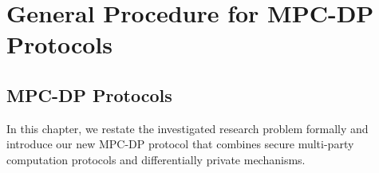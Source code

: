 \chapter{General Procedure for MPC-DP Protocols}
\label{cha:ProcedureMPCDP}




\section{MPC-DP Protocols}


In this chapter, we restate the investigated research problem formally and introduce our new MPC-DP protocol that combines secure multi-party computation protocols and differentially private mechanisms.

